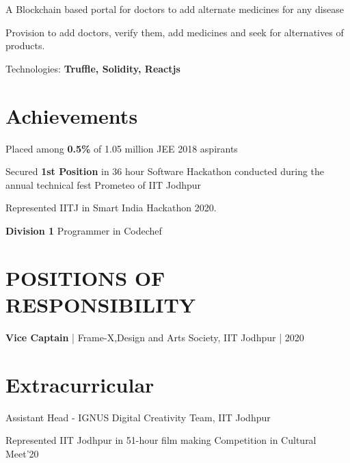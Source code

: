 \documentclass[]{deedy-resume-openfont}
\begin{document}
\begin{minipage}[t]{0.63\textwidth}
\begin{tightemize}
\item A Blockchain based portal for doctors to add alternate medicines for any disease
\item Provision to add doctors, verify them, add medicines and seek for alternatives of products.
\item Technologies: \textbf{Truffle, Solidity, Reactjs}
\end{tightemize}
\sectionsep


\section{Achievements}
\vspace{\topsep}
\begin{tightemize}
\item Placed among \textbf{0.5\%} of 1.05 million JEE 2018 aspirants
\item Secured \textbf{1st Position} in 36 hour Software Hackathon conducted during the annual technical fest Prometeo of IIT Jodhpur
\item Represented IITJ in Smart India Hackathon 2020.
\item \textbf{Division 1} Programmer in Codechef

\end{tightemize}
\sectionsep


\section{POSITIONS OF RESPONSIBILITY}
\item \textbf{Vice Captain} | Frame-X,Design and Arts Society, IIT Jodhpur | 2020
\sectionsep


\section{Extracurricular}
\vspace{\topsep} %
\begin{tightemize}
\item Assistant Head - IGNUS Digital Creativity Team, IIT Jodhpur
\item Represented IIT Jodhpur in 51-hour film making Competition in Cultural Meet'20
\end{tightemize}
\sectionsep

\end{minipage}
\end{document}
